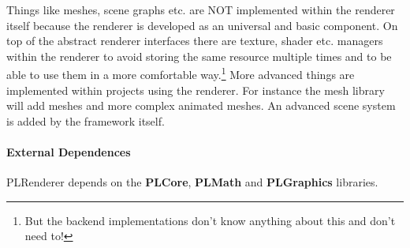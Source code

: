 Things like meshes, scene graphs etc. are NOT implemented within the renderer itself because the renderer is developed as an universal and basic component. On top of the abstract renderer interfaces there are texture, shader etc. managers within the renderer to avoid storing the same resource multiple times and to be able to use them in a more comfortable way.\footnote{But the backend implementations don't know anything about this and don't need to!} More advanced things are implemented within projects using the renderer. For instance the mesh library will add meshes and more complex animated meshes. An advanced scene system is added by the framework itself.


\paragraph{External Dependences}
PLRenderer depends on the \textbf{PLCore}, \textbf{PLMath} and \textbf{PLGraphics} libraries.





\cleardoublepage

\cleardoublepage

\cleardoublepage
\cleardoublepage
\cleardoublepage
\cleardoublepage
\cleardoublepage
\cleardoublepage
